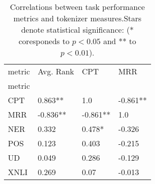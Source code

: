 \begin{table}
\centering
\caption{Correlations between task performance metrics and tokenizer measures.Stars denote statistical significance: (* coresponeds to $p<0.05$ and ** to $p<0.01$).}
\label{tab:corr_in_lang}
\begin{tabular}{llll}
\toprule
metric & Avg. Rank &       CPT &       MRR \\
metric &           &           &           \\
\midrule
CPT    &   0.863** &       1.0 &  -0.861** \\
MRR    &  -0.836** &  -0.861** &       1.0 \\
NER    &     0.332 &    0.478* &    -0.326 \\
POS    &     0.123 &     0.403 &    -0.215 \\
UD     &     0.049 &     0.286 &    -0.129 \\
XNLI   &     0.269 &      0.07 &    -0.013 \\
\bottomrule
\end{tabular}
\end{table}
